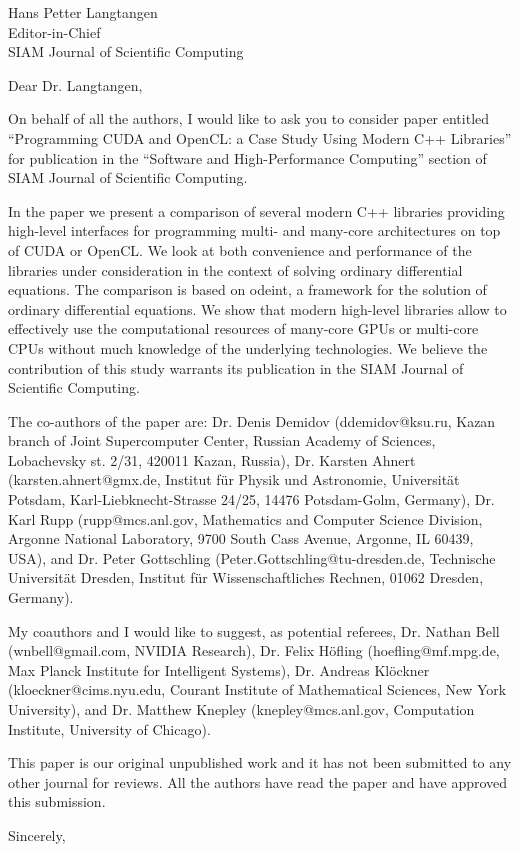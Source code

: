 \documentclass[a4paper,11pt]{letter}
\begin{document}
\begin{letter}{
    Hans Petter Langtangen\\
    Editor-in-Chief\\
    SIAM Journal of Scientific Computing
    }
\opening{Dear Dr. Langtangen,}

On behalf of all the authors, I would like to ask you to consider paper
entitled ``Programming CUDA and OpenCL: a Case Study Using Modern C++
Libraries'' for publication in the ``Software and High-Performance Computing''
section of SIAM Journal of Scientific Computing.

In the paper we present a comparison of several modern C++ libraries providing
high-level interfaces for programming multi- and many-core architectures on top
of CUDA or OpenCL.  We look at both convenience and performance of the
libraries under consideration in the context of solving ordinary differential
equations. The comparison is based on odeint, a framework for the solution of
ordinary differential equations. We show that modern high-level libraries allow
to effectively use the computational resources of many-core GPUs or multi-core
CPUs without much knowledge of the underlying technologies. We believe the
contribution of this study warrants its publication in the SIAM Journal of
Scientific Computing.

The co-authors of the paper are: Dr. Denis Demidov (ddemidov@ksu.ru, Kazan
branch of Joint Supercomputer Center, Russian Academy of Sciences, Lobachevsky
st. 2/31, 420011 Kazan, Russia), Dr. Karsten Ahnert (karsten.ahnert@gmx.de,
Institut f\"ur Physik und Astronomie, Universit\"at Potsdam,
Karl-Liebknecht-Strasse 24/25, 14476 Potsdam-Golm, Germany), Dr. Karl Rupp
(rupp@mcs.anl.gov, Mathematics and Computer Science Division, Argonne National
Laboratory, 9700 South Cass Avenue, Argonne, IL 60439, USA), and Dr. Peter
Gottschling (Peter.Gottschling@tu-dresden.de, Technische Universit\"at Dresden,
Institut f\"ur Wissenschaftliches Rechnen, 01062 Dresden, Germany).

My coauthors and I would like to suggest, as potential referees, Dr. Nathan
Bell (wnbell@gmail.com, NVIDIA Research), Dr. Felix H\"ofling
(hoefling@mf.mpg.de, Max Planck Institute for Intelligent Systems), Dr. Andreas
Kl\"ockner (kloeckner@cims.nyu.edu, Courant Institute of Mathematical Sciences,
New York University), and Dr. Matthew Knepley (knepley@mcs.anl.gov, Computation
Institute, University of Chicago).

This paper is our original unpublished work and it has not been submitted to
any other journal for reviews. All the authors have read the paper and have
approved this submission.

\closing{Sincerely,}

\end{letter}
\end{document}
